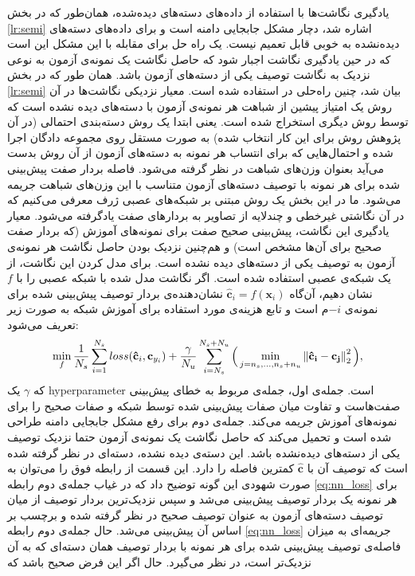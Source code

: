 یادگیری نگاشت‌ها با استفاده از داده‌های دسته‌های دیده‌شده، همان‌طور که در بخش \ref{lr:semi} اشاره شد، دچار مشکل جابجایی دامنه است و  برای داده‌های دسته‌های دیده‌نشده به خوبی قابل تعمیم نیست. یک راه حل برای مقابله با این مشکل این است که در حین یادگیری نگاشت اجبار شود که حاصل نگاشت یک نمونه‌ی آزمون به نوعی نزدیک به نگاشت توصیف یکی از دسته‌های آزمون باشد. همان ‌طور که در بخش
\ref{lr:semi}
بیان شد، چنین راه‌حلی در
\cite{Kodirov2015}
استفاده شده است. معیار نزدیکی نگاشت‌ها در آن روش یک امتیاز پیشین از شباهت هر نمونه‌ی آزمون با دسته‌های دیده نشده است که  توسط روش دیگری استخراج شده است. یعنی ابتدا یک روش دسته‌بندی
احتمالی  (در آن پژوهش روش  \cite{lampert09} برای این کار انتخاب شده) به صورت مستقل روی مجموعه دادگان اجرا شده و احتمال‌هایی که برای انتساب هر نمونه به دسته‌های آزمون از آن روش بدست می‌آید بعنوان وزن‌های شباهت در نظر گرفته می‌شود. فاصله بردار صفت پیش‌بینی شده برای هر نمونه با توصیف دسته‌های آزمون متناسب با این وزن‌های شباهت جریمه می‌شود.
 ما در این بخش یک روش مبتنی بر شبکه‌های عصبی ژرف معرفی می‌کنیم که در آن نگاشتی غیرخطی و چندلایه از تصاویر به بردارهای صفت یادگرفته می‌شود. معیار یادگیری این نگاشت، پیش‌بینی صحیح صفت برای نمونه‌های آموزش (که بردار صفت صحیح برای آن‌ها مشخص است) و هم‌چنین نزدیک بودن حاصل نگاشت هر نمونه‌ی آزمون به توصیف یکی از دسته‌های دیده نشده است. برای مدل کردن این نگاشت، از یک شبکه‌ی عصبی استفاده شده است. اگر نگاشت مدل شده با شبکه عصبی را با $f$ نشان دهیم، آن‌گاه
 $\mathbf{\hat{c}}_i = f (\mathbf{x}_i) $
 نشان‌دهنده‌ی بردار توصیف پیش‌بینی شده برای نمونه‌ی $-i$م است و
  تابع هزینه‌ی مورد استفاده برای آموزش شبکه به صورت زیر تعریف می‌شود:
\begin{equation}
\label{eq:nn_loss}
\min_{f}
\frac{1}{N_s} \sum_{i=1}^{N_s} loss(\mathbf{\hat{c}}_i, \mathbf{c}_{y_i}) +
\frac{\gamma}{N_u} \sum_{i=N_s}^{N_s+N_u} \Big ( \min_{j=n_s,\ldots,n_s + n_u} \left \lVert \mathbf{\hat{c}_i - c_j} \right \rVert_2^2 \Big ),
\end{equation}
که $\gamma$ یک \gls{hyperparameter} است.
جمله‌ی اول، جمله‌ی مربوط به خطای پیش‌بینی صفت‌هاست و تفاوت میان صفات پیش‌بینی شده توسط شبکه و صفات صحیح را برای نمونه‌های آموزش جریمه می‌کند.
 جمله‌ی دوم برای رفع مشکل جابجایی دامنه طراحی شده است و تحمیل می‌کند که حاصل نگاشت یک نمونه‌ی آزمون حتما نزدیک توصیف یکی از دسته‌های دیده‌نشده باشد. این دسته‌ی دیده نشده، دسته‌ای در نظر گرفته شده است که توصیف آن با $\mathbf{\hat{c}}$ کمترین فاصله را دارد. این قسمت از رابطه فوق را می‌توان به صورت شهودی این گونه توضیح داد که در غیاب جمله‌ی دوم رابطه \eqref{eq:nn_loss} برای هر نمونه یک بردار توصیف پیش‌بینی می‌شد و سپس نزدیک‌ترین بردار توصیف از میان توصیف دسته‌های آزمون به عنوان توصیف صحیح در نظر گرفته شده و برچسب بر اساس آن پیش‌بینی می‌شد. حال جمله‌ی دوم رابطه \eqref{eq:nn_loss} جریمه‌ای به میزان فاصله‌ی توصیف پیش‌بینی شده برای هر نمونه با بردار توصیف همان دسته‌ای که به آن نزدیک‌تر است، در نظر می‌گیرد. حال اگر این فرض صحیح باشد که

